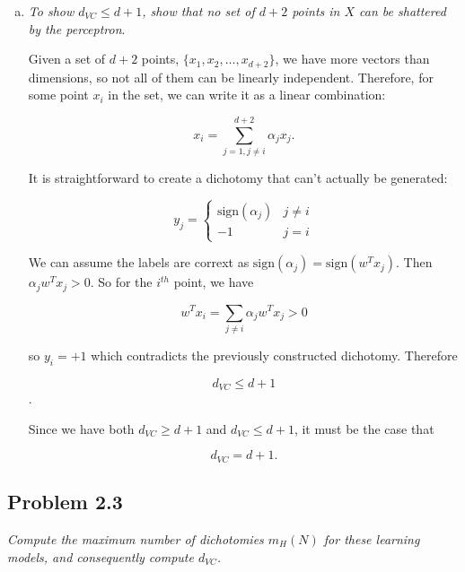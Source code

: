 \documentclass{article}
\begin{document}
\begin{enumerate}[(a)]
  \item \textit{To show $d_{VC} \leq d+1$, show that no set of $d+2$ points in $X$ can be shattered
    by the perceptron}. 

    Given a set of $d+2$ points, $\{x_1, x_2, \dots, x_{d+2}\}$, we have more vectors than dimensions,
    so not all of them can be linearly independent. Therefore, for some point $x_i$ in the set, we can
    write it as a linear combination:

    $$ x_i = \sum_{j=1, j\neq i}^{d+2} \alpha_jx_j.$$

    It is straightforward to create a dichotomy that can't actually be generated:

    $$y_j = \begin{cases} \text{sign}(\alpha_j) & j \neq i \\ -1 & j = i \end{cases} $$

    We can assume the labels are corrext as $\text{sign}(\alpha_j) = \text{sign}(w^Tx_j)$. Then
    $\alpha_jw^Tx_j > 0$. So for the $i^{th}$ point, we have

    $$w^T x_i = \sum_{j\neq i} \alpha_jw^Tx_j > 0$$

    so $y_i = +1$ which contradicts the previously constructed dichotomy. Therefore
    
    $$d_{VC} \leq d+1$$.

    Since we have both $d_{VC} \geq d+1$ and $d_{VC} \leq d+1$, it must be the case that

    $$d_{VC} = d+1.$$

\end{enumerate}



\subsection*{Problem 2.3}

\textit{Compute the maximum number of dichotomies $m_{H}(N)$ for these learning models, and
consequently compute $d_{VC}$.}
\end{document}

